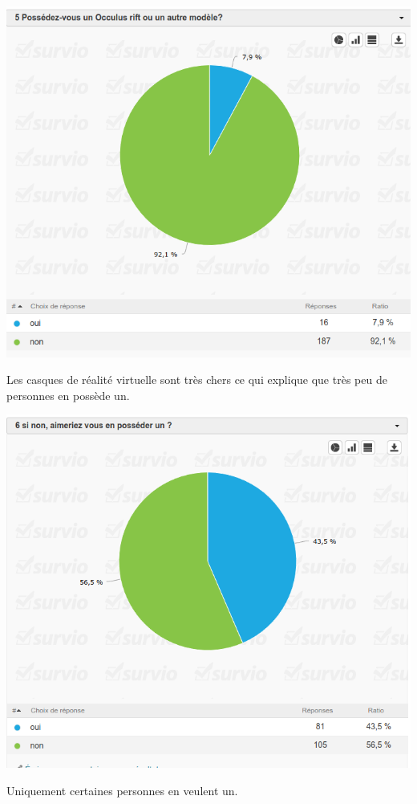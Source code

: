 \documentclass[12pt, a4paper]{report}
\begin{document}
\begin{center}
\includegraphics[scale=0.5]{5.png}

Les casques de réalité virtuelle sont très chers ce qui explique que très peu de personnes en possède un.
\end{center}

\begin{center}
\includegraphics[scale=0.5]{6.png}

Uniquement certaines personnes en veulent un.
\end{center}
\end{document}
